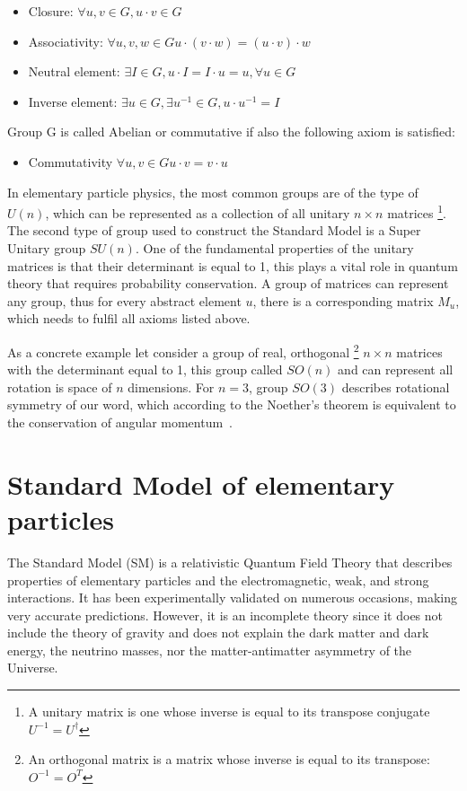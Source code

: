 \begin{itemize}
    \item Closure: $\forall u,v \in G, u\cdot v \in G$
    \item Associativity: $\forall u,v,w \in G u \cdot (v \cdot w ) = (u \cdot v) \cdot w$
    \item Neutral element:  $\exists I \in G, u \cdot I = I \cdot u = u, \forall u \in G$
    \item Inverse element:  $\exists u \in G, \exists u^{-1} \in G, u \cdot u^{-1} = I$
\end{itemize}

Group G is called Abelian or commutative if also the following axiom is satisfied:
\begin{itemize}
    \item Commutativity $\forall u,v \in G u \cdot v = v \cdot u$
\end{itemize}

In elementary particle physics, the most common groups are of the type of $U(n)$, which can be represented as a collection of all unitary $n\times n$ matrices \footnote{A unitary matrix is one whose inverse is equal to its transpose conjugate $U^{-1}=U^\dagger$}. The second type of group used to construct the Standard Model is a Super Unitary group $SU(n)$. One of the fundamental properties of the unitary matrices is that their determinant is equal to 1, this plays a vital role in quantum theory that requires probability
conservation. 
A group of matrices can represent any group, thus for every abstract element $u$, there is a corresponding matrix $M_u$, which needs to fulfil all axioms listed above. 

As a concrete example let consider a group of real, orthogonal \footnote{An orthogonal matrix is a matrix whose inverse is equal to its transpose: $O^{-1} = O^{T}$} $n\times n$ matrices with the determinant equal to  1, this group called $SO(n)$ and can represent all rotation is space of $n$ dimensions. For $n=3$, group $SO(3)$  describes rotational symmetry of our word, which according to the Noether's theorem is equivalent to the conservation of angular momentum~\cite{griffiths}. 

\section{Standard Model of elementary particles}
\label{sec:SM}

The Standard Model (SM) is a relativistic Quantum Field Theory that describes properties of elementary particles and the electromagnetic, weak, and strong interactions. It has been experimentally validated on numerous occasions,
making very accurate predictions. However, it is an incomplete theory since it does not include the theory of gravity and does not explain the dark matter and dark energy, the neutrino masses, nor the matter-antimatter asymmetry of the Universe.

